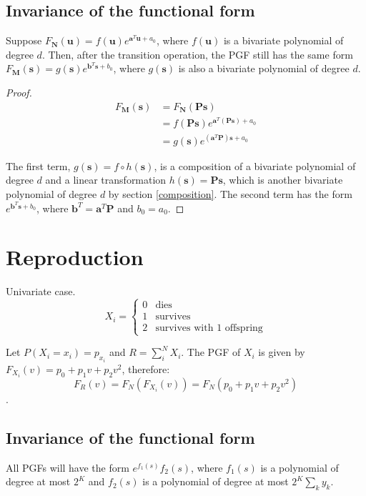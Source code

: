 \documentclass{article}
\begin{document}
\subsection{Invariance of the functional form}
Suppose $F_{\mathbf{N}}(\mathbf{u}) = f(\mathbf{u}) e^{\mathbf{a}^T \mathbf{u} + a_0}$, where $f(\mathbf{u})$ is a bivariate polynomial of degree $d$. Then, after the transition operation, the PGF still has the same form $F_{\mathbf{M}}(\mathbf{s}) = g(\mathbf{s}) e^{\mathbf{b}^T \mathbf{s} + b_0}$, where $g(\mathbf{s})$ is also a bivariate polynomial of degree $d$.

\begin{proof}
\begin{align*}
F_{\mathbf{M}}(\mathbf{s}) &=  F_{\mathbf{N}}(\mathbf{P} \mathbf{s}) \\
&= f(\mathbf{P} \mathbf{s}) e^{\mathbf{a}^T (\mathbf{\mathbf{P} \mathbf{s}}) + a_0} \\
&= g(\mathbf{s}) e^{(\mathbf{a}^T \mathbf{P}) \mathbf{s} + a_0}
\end{align*}

The first term, $g(\mathbf{s}) = f \circ h(\mathbf{s})$, is a composition of a bivariate polynomial of degree $d$ and a linear transformation $h(\mathbf{s}) = \mathbf{P} \mathbf{s}$, which is another bivariate polynomial of degree $d$ by section \ref{composition}. The second term has the form $e^{\mathbf{b}^T \mathbf{s} + b_0}$, where $\mathbf{b}^T = \mathbf{a}^T \mathbf{P}$ and $b_0 = a_0$.

\end{proof}

\section{Reproduction}
Univariate case.
\[ X_i =
\begin{cases} 
    0 & \text{dies} \\
    1 & \text{survives} \\
    2 & \text{survives with 1 offspring}
\end{cases}
\]

Let $P(X_i = x_i) = p_{x_i}$ and $R = \sum_i^N X_i $. The PGF of $X_i$ is given by $F_{X_i}(v) = p_0 + p_1v + p_2v^2$, therefore:
$$F_R(v) = F_N(F_{X_i}(v)) = F_N(p_0 + p_1v + p_2v^2)$$.

\subsection{Invariance of the functional form}
All PGFs will have the form $e^{f_1(s)}f_2(s)$, where $f_1(s)$ is a polynomial of degree at most $2^K$ and $f_2(s)$ is a polynomial of degree at most $2^K \sum_k y_k$.
\end{document}
